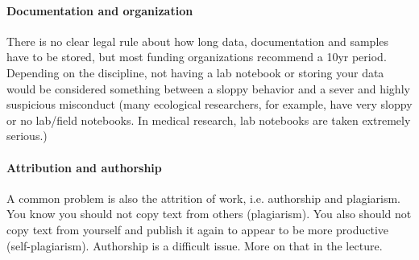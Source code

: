 \documentclass{tufte-book}
\begin{document}
\paragraph{Documentation and organization} There is no clear legal rule about how long data, documentation and samples have to be stored, but most funding organizations recommend a 10yr period. Depending on the discipline, not having a lab notebook or storing your data would be considered something between a sloppy behavior and a sever and highly suspicious misconduct (many ecological researchers, for example, have very sloppy or no lab/field notebooks. In medical research, lab notebooks are taken extremely serious.)

\paragraph{Attribution and authorship} A common problem is also the attrition of work, i.e. authorship and plagiarism. You know you should not copy text from others (plagiarism). You also should not copy text from yourself and publish it again to appear to be more productive (self-plagiarism). Authorship is a difficult issue. More on that in the lecture. 




\end{document}

